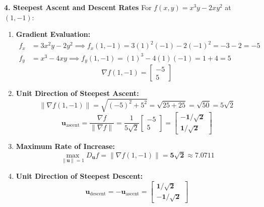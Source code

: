 \textbf{4. Steepest Ascent and Descent Rates}
For $f(x, y) = x^3 y - 2x y^2$ at $(1, -1)$:
\begin{enumerate}
    \item \textbf{Gradient Evaluation:}
    \begin{align*}
    f_x &= 3x^2 y - 2y^2 \implies f_x(1, -1) = 3(1)^2(-1) - 2(-1)^2 = -3 - 2 = -5 \\
    f_y &= x^3 - 4xy \implies f_y(1, -1) = (1)^3 - 4(1)(-1) = 1 + 4 = 5
    \end{align*}
    \begin{equation*}
    \nabla f(1, -1) = \begin{bmatrix} -5 \\ 5 \end{bmatrix}
    \end{equation*}
    \item \textbf{Unit Direction of Steepest Ascent:}
    \begin{equation*}
    \|\nabla f(1, -1)\| = \sqrt{(-5)^2 + 5^2} = \sqrt{25 + 25} = \sqrt{50} = 5\sqrt{2}
    \end{equation*}
    \begin{equation*}
    \mathbf{u}_{\text{ascent}} = \frac{\nabla f}{\|\nabla f\|} = \frac{1}{5\sqrt{2}} \begin{bmatrix} -5 \\ 5 \end{bmatrix} = \mathbf{\begin{bmatrix} -1/\sqrt{2} \\ 1/\sqrt{2} \end{bmatrix}}
    \end{equation*}
    \item \textbf{Maximum Rate of Increase:}
    \begin{equation*}
    \max_{\|\mathbf{u}\|=1} D_{\mathbf{u}} f = \|\nabla f(1, -1)\| = \mathbf{5\sqrt{2} \approx 7.0711}
    \end{equation*}
    \item \textbf{Unit Direction of Steepest Descent:}
    \begin{equation*}
    \mathbf{u}_{\text{descent}} = -\mathbf{u}_{\text{ascent}} = \mathbf{\begin{bmatrix} 1/\sqrt{2} \\ -1/\sqrt{2} \end{bmatrix}}
    \end{equation*}
\end{enumerate}

